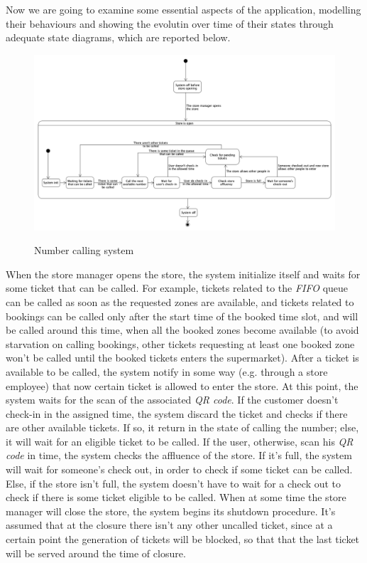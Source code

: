 \documentclass{article}
\begin{document}
		Now we are going to examine some essential aspects of the application, modelling their behaviours and showing the evolutin over time of their states through adequate state diagrams, which are reported below.
		
		\begin{figure}[!h]
			
			\centering
			\includegraphics[scale=0.23]{statechart1.PNG} \\
			\caption{Number calling system}
			
		\end{figure}
	
		When the store manager opens the store, the system initialize itself and waits for some ticket that can be called. For example, tickets related to the \emph{FIFO} queue can be called as soon as the requested zones are available, and tickets related to bookings can be called only after the start time of the booked time slot, and will be called around this time, when all the booked zones become available (to avoid starvation on calling bookings, other tickets requesting at least one booked zone won't be called until the booked tickets enters the supermarket). After a ticket is available to be called, the system notify in some way (e.g. through a store employee) that now certain ticket is allowed to enter the store. At this point, the system waits for the scan of the associated \emph{QR code}. If the customer doesn't check-in in the assigned time, the system discard the ticket and checks if there are other available tickets. If so, it return in the state of calling the number; else, it will wait for an eligible ticket to be called. If the user, otherwise, scan his \emph{QR code} in time, the system checks the affluence of the store. If it's full, the system will wait for someone's check out, in order to check if some ticket can be called. Else, if the store isn't full, the system doesn't have to wait for a check out to check if there is some ticket eligible to be called. When at some time the store manager will close the store, the system begins its shutdown procedure. It's assumed that at the closure there isn't any other uncalled ticket, since at a certain point the generation of tickets will be blocked, so that that the last ticket will be served around the time of closure.
		
\end{document}
